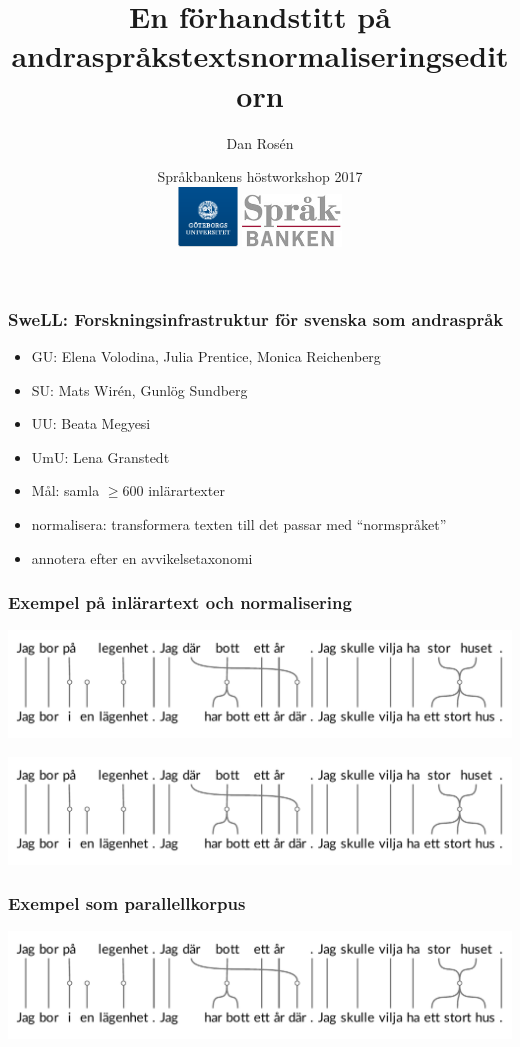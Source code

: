 \documentclass[ignorenonframetext,]{beamer}
\title{\Large En förhandstitt på andraspråkstextsnormaliseringseditorn}
\author{\large Dan Rosén \\
}
\date{\large Språkbankens höstworkshop 2017
  \vspace{1cm}
  \\
  \includegraphics[height=1.6cm]{logo_gu.png}
  \hspace{5cm}
  \includegraphics[height=1.4cm]{logo_sb.jpg}
}
\begin{document}
\frame{\titlepage}


\begin{frame}
\frametitle{SweLL:
Forskningsinfrastruktur för svenska som andraspråk}
\begin{itemize}
\item GU: Elena Volodina, Julia Prentice, Monica Reichenberg
\item SU: Mats Wirén, Gunlög Sundberg
\item UU: Beata Megyesi
\item UmU: Lena Granstedt
\vspace{\baselineskip}
\item Mål: samla $\geq$600 inlärartexter
\item normalisera: transformera texten till det passar med ``normspråket''
\item annotera efter en avvikelsetaxonomi
\end{itemize}
\end{frame}

\begin{frame}
\frametitle{Exempel på inlärartext och normalisering}
\includegraphics[width=\textwidth, trim={0 3.3cm 0 0}, clip]{ladder_black.pdf}
\pause
\vspace{0.66cm}

\includegraphics[width=\textwidth, trim={0 0 0 3.3cm}, clip]{ladder_black.pdf}
\end{frame}

\begin{frame}
\frametitle{Exempel som parallellkorpus}
\includegraphics[width=\textwidth]{ladder_black.pdf}
\end{frame}
\end{document}
